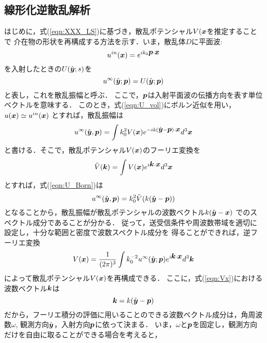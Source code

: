 \subsection{線形化逆散乱解析}
はじめに，式(\ref{eqn:XXX_LS})に基づき，散乱ポテンシャル$V(\mbox{\boldmath $x$}$を推定することで
介在物の形状を再構成する方法を示す．いま，散乱体$D$に平面波:
\begin{equation}
	u^{in}(\mbox{\boldmath $x$})= e^{ik_0\mbox{\boldmath $p$}\cdot\mbox{\boldmath $x$}}
	\label{eqn:}
\end{equation}
を入射したときの$U(\hat{\mbox{\boldmath $y$}};s)$を
\begin{equation}
	u^{\infty}(\hat{\mbox{\boldmath $y$}};\mbox{\boldmath $p$})=U(\hat{\mbox{\boldmath $y$}};\mbox{\boldmath $p$})
	\label{eqn:}
\end{equation}
と表し，これを散乱振幅と呼ぶ．
ここで，$\mbox{\boldmath $p$}$は入射平面波の伝播方向を表す単位ベクトルを意味する．
このとき，式(\ref{eqn:U_vol})にボルン近似を用い，$u(\mbox{\boldmath $x$})\simeq u^{in}(\mbox{\boldmath $x$})$
とすれば，散乱振幅は
\begin{equation}
	u^{\infty}(\hat{\mbox{\boldmath $y$}},\mbox{\boldmath $p$})
	=
	\int
	k_0^2 V(\mbox{\boldmath $x$}) e^{-ik(\hat{\mbox{\boldmath $y$}}-\mbox{\boldmath $p$} )\cdot \mbox{\boldmath $x$}}d^3\mbox{\boldmath $x$}
	\label{eqn:U_Born}
\end{equation}
と書ける．そこで，散乱ポテンシャル$V(\mbox{\boldmath $x$})$のフーリエ変換を
\begin{equation}
	\tilde V(\mbox{\boldmath $k$}) = \int V(\mbox{\boldmath $x$}) e^{i\mbox{\boldmath $k$}\cdot \mbox{\boldmath $x$}} d^3\mbox{\boldmath $x$}
	\label{eqn:Vk}
\end{equation}
とすれば，式(\ref{eqn:U_Born})は
\begin{equation}
	u^{\infty}(\hat{\mbox{\boldmath $y$}},\mbox{\boldmath $p$}) =k_0^2 \tilde V (
	k(\hat{\mbox{\boldmath $y$}}-\mbox{\boldmath $p$} )
	)
	\label{eqn:}
\end{equation}
となることから，散乱振幅が散乱ポテンシャルの波数ベクトル$k(\hat{\mbox{\boldmath $y$}}-\mbox{\boldmath $x$})$
でのスペクトル成分であることが分かる．
従って，送受信条件や周波数帯域を適切に設定し，十分な範囲と密度で波数スペクトル成分を
得ることができれば，逆フーリエ変換
\begin{equation}
	V(\mbox{\boldmath $x$}) =\frac{1}{(2\pi)^3} \int k_0^{-2} u^{\infty}(\hat{\mbox{\boldmath $y$}};\mbox{\boldmath $p$}) 
	e^{i\mbox{\boldmath $k$}\cdot \mbox{\boldmath $x$}}d^3\mbox{\boldmath $k$}
	\label{eqn:Vx}
\end{equation}
によって散乱ポテンシャル$V(\mbox{\boldmath $x$})$を再構成できる．
ここに，式(\ref{eqn:Vx})における波数ベクトル$\mbox{\boldmath $k$}$は
\begin{equation}
	\mbox{\boldmath $k$}=k(\hat{\mbox{\boldmath $y$}}-\mbox{\boldmath $p$})
	\label{eqn:}
\end{equation}
だから，フーリエ積分の評価に用いることのできる波数ベクトル成分は，角周波数$\omega$,
観測方向$\hat{\mbox{\boldmath $y$}}$，入射方向$\mbox{\boldmath $p$}$に依って決まる．
いま，$\omega$と$\mbox{\boldmath $p$}$を固定し，観測方向だけを自由に取ることができる場合を考えると，
